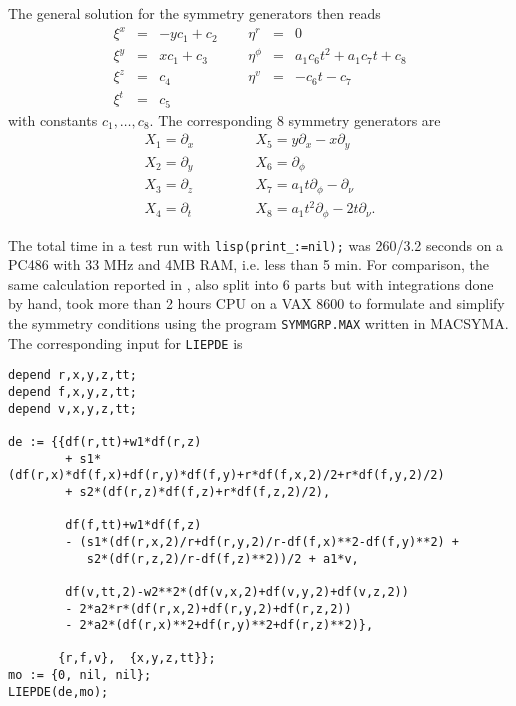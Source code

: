The general solution for the symmetry generators then reads
\[ \begin{array}{rclrcl}
 \xi^x & = & - y c_1 + c_2 \;\;\;\;\; &  \eta^r & = & 0  \\
 \xi^y & = & x c_1 + c_3  &  \eta^\phi & = & a_1 c_6 t^2 + a_1 c_7 t + c_8  \\
 \xi^z & = & c_4      &  \eta^v & = & - c_6 t - c_7     \\
 \xi^t & = & c_5  & & &
\end{array}
\]
with constants $c_1, \ldots, c_8.$ The corresponding 8 symmetry generators are
\begin{eqnarray*}
 X_1 = \partial_x & \;\;\;\;\;\;\;\;\;\; & X_5 = y\partial_x - x\partial_y \\
 X_2 = \partial_y & &  X_6 = \partial_\phi               \\
 X_3 = \partial_z & & X_7 = a_1t\partial_\phi - \partial_\nu \\
 X_4 = \partial_t & & X_8 = a_1t^2\partial_\phi - 2t\partial_\nu.
\end{eqnarray*}

The total time in a test run with {\tt lisp(print\_:=nil);} was
260/3.2 seconds on a PC486 with 33 MHz and 4MB RAM,
i.e. less than 5 min.
For comparison, the same calculation reported in \cite{Cham}, also split
into 6 parts but with integrations done by hand, took more than 2 hours CPU
on a VAX 8600 to formulate and simplify the symmetry conditions using the
program {\tt SYMMGRP.MAX} written in MACSYMA.
The corresponding input for {\tt LIEPDE} is
\begin{verbatim}
depend r,x,y,z,tt;
depend f,x,y,z,tt;
depend v,x,y,z,tt;

de := {{df(r,tt)+w1*df(r,z)
        + s1*(df(r,x)*df(f,x)+df(r,y)*df(f,y)+r*df(f,x,2)/2+r*df(f,y,2)/2)
        + s2*(df(r,z)*df(f,z)+r*df(f,z,2)/2),

        df(f,tt)+w1*df(f,z)
        - (s1*(df(r,x,2)/r+df(r,y,2)/r-df(f,x)**2-df(f,y)**2) +
           s2*(df(r,z,2)/r-df(f,z)**2))/2 + a1*v,

        df(v,tt,2)-w2**2*(df(v,x,2)+df(v,y,2)+df(v,z,2))
        - 2*a2*r*(df(r,x,2)+df(r,y,2)+df(r,z,2))
        - 2*a2*(df(r,x)**2+df(r,y)**2+df(r,z)**2)},

       {r,f,v},  {x,y,z,tt}};
mo := {0, nil, nil};
LIEPDE(de,mo);
\end{verbatim}

